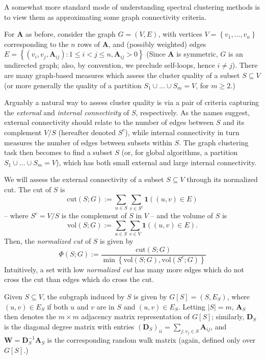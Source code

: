 \documentclass{article}
\newcommand{\set}[1]{\left\{#1\right\}}
\newcommand{\vol}{\mathrm{vol}}
\newcommand{\cut}{\mathrm{cut}}
\newcommand{\abs}[1]{\left \lvert #1 \right \rvert}
\newcommand{\1}{\mathbf{1}}
\newcommand{\Abf}{\mathbf{A}}
\newcommand{\Wbf}{\mathbf{W}}
\newcommand{\Dbf}{\mathbf{D}}
\theoremstyle{aldenthm}
\theoremstyle{remark}
\begin{document}
A somewhat more standard mode of understanding spectral clustering methods is to view them as approximating some graph connectivity criteria.

For $\Abf$ as before, consider the graph $G  = (V,E)$, with vertices $V = \set{v_1, \ldots, v_n}$ corresponding to the $n$ rows of $\Abf$, and (possibly weighted) edges $E = \set{(v_i,v_j,\Abf_{ij}): 1 \leq i < j \leq n, \Abf_{ij} > 0}$ (Since $\Abf$ is symmetric, $G$ is an undirected graph; also, by convention, we preclude self-loops, hence $i \neq j$). There are many \cite{yang2015,fortunato2010} graph-based measures which assess the cluster quality of a subset $S \subseteq V$ (or more generally the quality of a partition $S_1 \cup \ldots \cup S_m = V$, for $m \geq 2$.)

Arguably a natural way to assess cluster quality is via a pair of criteria capturing the \textit{external} and \textit{internal connectivity} of $S$, respectively.  As the names suggest, external connectivity should relate to the number of edges between $S$ and its complement $V / S$ (hereafter denoted $S^c$), while internal connectivity in turn measures the number of edges between subsets within $S$. The graph clustering task then becomes to find a subset $S$ (or, for global algorithms, a partition $S_1 \cup \ldots \cup S_m = V$), which has both small external and large internal connectivity. 

We will assess the external connectivity of a subset $S \subseteq V$ through its normalized cut. The cut of $S$ is
\begin{equation*}
\cut(S; G) := \sum_{u \in S} \sum_{v \in S^c} \1\left((u,v) \in E \right)
\end{equation*}
-- where $S^c = V / S$ is the complement of $S$ in $V$ -- and the volume of $S$ is
\begin{equation*}
\vol(S; G) := \sum_{u \in S} \sum_{v \in V} \1\left((u,v) \in E \right).
\end{equation*}
Then, the \emph{normalized cut} of $S$ is given by
\begin{equation}
\label{eqn: norm_cut}
\Phi(S; G) := \frac{\cut(S; G)}{ \min\left\{\vol(S; G), \vol(S^c; G) \right\} }
\end{equation} 
Intuitively, a set with low \textit{normalized cut} has many more edges which do not cross the cut than edges which do cross the cut. 

Given $S \subseteq V$, the subgraph induced by $S$ is given by $G[S] = (S, E_S)$, where $(u,v) \in E_S$ if both $u$ and $v$ are in $S$ and $(u,v) \in E_S$. Letting $\abs{S} = m$, $\Abf_S$ then denotes the $m \times m$ adjacency matrix representation of $G[S]$; similarly, $\Dbf_S$ is the diagonal degree matrix with entries $(\Dbf_{S})_{ii} = \sum_{j: v_j \in S} \Abf_{ij}$, and $\Wbf = \Dbf_S^{-1} \Abf_S$ is the corresponding random walk matrix (again, defined only over $G[S]$.)
\end{document}
